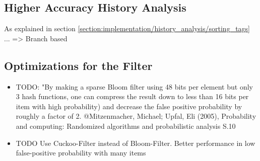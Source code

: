 \subsection{Higher Accuracy History Analysis}
As explained in section \ref{section:implementation/history_analysis/sorting_tags} ... => Branch based

\subsection{Optimizations for the Filter}
\begin{itemize}
\item TODO: "By making a sparse Bloom filter using 48 bits per element but only 3 hash functions, one can compress the result down to less than 16 bits per item with high probability) and decrease the false positive probability by roughly a factor of 2. @Mitzenmacher, Michael; Upfal, Eli (2005), Probability and computing: Randomized algorithms and probabilistic analysis S.10
\item TODO Use Cuckoo-Filter \cite{fan2014cuckoo} instead of Bloom-Filter. Better performance in low false-positive probability with many items
\end{itemize}